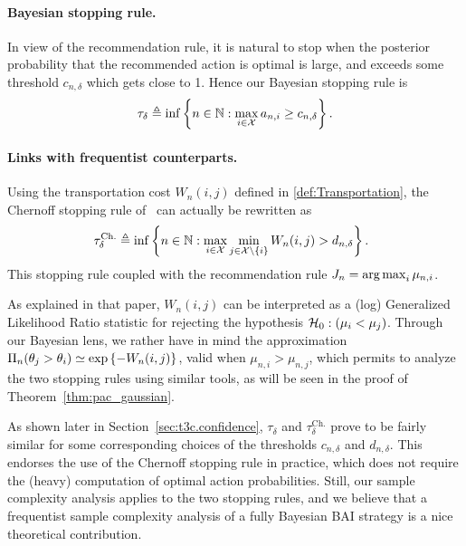 \paragraph{Bayesian stopping rule.}
In view of the recommendation rule, it is natural to stop when the posterior probability that the recommended action is optimal is large, and exceeds some threshold $c_{n,\delta}$ which gets close to 1. Hence our Bayesian stopping rule is \begin{equation}\label{eq:stopping}
    \tau_{\delta} \triangleq \inf \left\{ n\in{\mathbb N}:\max_{i\in\mathcal{X}} a_{n,i} \geq c_{n,\delta} \right\}.
\end{equation}

\paragraph{Links with frequentist counterparts.} 
Using the transportation cost $W_n(i,j)$ defined in \eqref{def:Transportation}, the Chernoff stopping rule of~\cite{garivier2016tracknstop} can actually be rewritten as
\begin{equation}\label{eq:chernoffstoppingtime}
\hspace{-0.2cm}\tau_\delta^{\text{Ch.}} \eqdef \inf \left\lbrace n \in \mathbb{N} : \max_{i \in \cX} \min_{j \in \cX \setminus \{i\} } W_{n}(i,j) > d_{n,\delta} \right\rbrace.
\end{equation}
This stopping rule coupled with the recommendation rule $J_n = \operatorname*{arg\,max}_{i} \mu_{n,i}$. 

As explained in that paper, $W_{n}(i,j)$ can be interpreted as a (log) Generalized Likelihood Ratio statistic for rejecting the hypothesis $\mathcal{H}_0 : (\mu_i < \mu_j)$. Through our Bayesian lens, we rather have in mind the approximation $\Pi_n(\theta_j > \theta_i) \simeq \exp\left\{-W_n(i,j)\right\}$, valid when $\mu_{n,i}> \mu_{n,j}$, which permits to analyze the two stopping rules using similar tools, as will be seen in the proof of Theorem~\ref{thm:pac_gaussian}. 

As shown later in Section~\ref{sec:t3c.confidence}, $\tau_\delta$ and $\tau_\delta^{\text{Ch.}}$ prove to be fairly similar for some corresponding choices of the thresholds $c_{n,\delta}$ and $d_{n,\delta}$. This endorses the use of the Chernoff stopping rule in practice, which does not require the (heavy) computation of optimal action probabilities. Still, our sample complexity analysis applies to the two stopping rules, and we believe that a frequentist sample complexity analysis of a fully Bayesian BAI strategy is a nice theoretical contribution.

